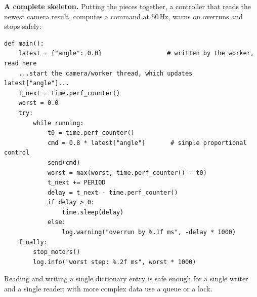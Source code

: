 \begin{example}
\textbf{A complete skeleton.} Putting the pieces together, a controller that reads the newest camera result, computes a command at $50$\,Hz, warns on overruns and stops safely:
\begin{verbatim}
def main():
    latest = {"angle": 0.0}                  # written by the worker, read here
    ...start the camera/worker thread, which updates latest["angle"]...
    t_next = time.perf_counter()
    worst = 0.0
    try:
        while running:
            t0 = time.perf_counter()
            cmd = 0.8 * latest["angle"]       # simple proportional control
            send(cmd)
            worst = max(worst, time.perf_counter() - t0)
            t_next += PERIOD
            delay = t_next - time.perf_counter()
            if delay > 0:
                time.sleep(delay)
            else:
                log.warning("overrun by %.1f ms", -delay * 1000)
    finally:
        stop_motors()
        log.info("worst step: %.2f ms", worst * 1000)
\end{verbatim}
Reading and writing a single dictionary entry is safe enough for a single writer and a single reader; with more complex data use a queue or a lock.
\end{example}

